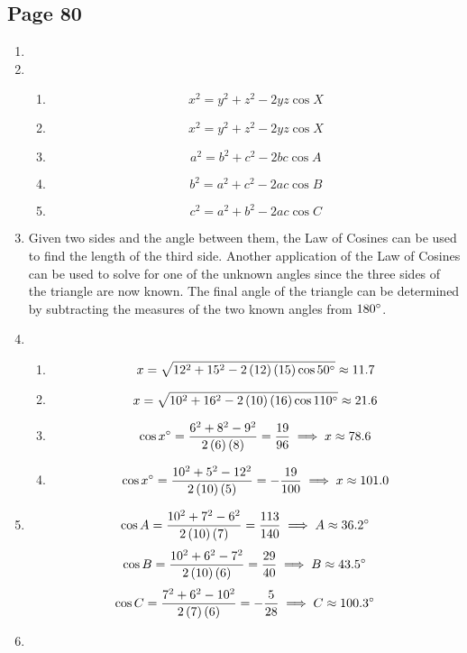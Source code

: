 \documentclass{article}
\newenvironment{solutions}[1]
{\subsection*{#1}
 \begin{enumerate}[leftmargin=1.5em]}
{\end{enumerate}}
\newcommand{\solution}{\item}
\newenvironment{subsolutions}
{\begin{enumerate}}
{\end{enumerate}}
\newcommand{\subsolution}{\item}
\begin{document}
\begin{solutions}{Page 80}
\solution %
\solution %
\begin{subsolutions}
\subsolution %
\[
x^2 = y^2 + z^2 - 2yz\cos{X}
\]
\subsolution %
\[
x^2 = y^2 + z^2 - 2yz\cos{X}
\]
\subsolution %
\[
a^2 = b^2 + c^2 - 2bc\cos{A}
\]
\subsolution %
\[
b^2 = a^2 + c^2 - 2ac\cos{B}
\]
\subsolution %
\[
c^2 = a^2 + b^2 - 2ac\cos{C}
\]
\end{subsolutions}

\solution %
Given two sides and the angle between them, the Law of Cosines can be used to find the length of the third side. Another application of the Law of Cosines can be used to solve for one of the unknown angles since the three sides of the triangle are now known. The final angle of the triangle can be determined by subtracting the measures of the two known angles from $180\degree$.

\solution %
\begin{subsolutions}
\subsolution %
\[
x = \sqrt{12^2+15^2-2\left(12\right)\left(15\right)\cos{50\degree}} \approx 11.7
\]
\subsolution %
\[
x = \sqrt{10^2+16^2-2\left(10\right)\left(16\right)\cos{110\degree}} \approx 21.6
\]
\subsolution %
\[
\cos{x\degree} = \dfrac{6^2+8^2-9^2}{2\left(6\right)\left(8\right)} = \dfrac{19}{96} \implies x \approx 78.6
\]
\subsolution %
\[
\cos{x\degree} = \dfrac{10^2+5^2-12^2}{2\left(10\right)\left(5\right)} = -\dfrac{19}{100} \implies x \approx101.0
\]
\end{subsolutions}

\solution %
\[
\cos{A} = \dfrac{10^2+7^2-6^2}{2\left(10\right)\left(7\right)} = \dfrac{113}{140} \implies A \approx 36.2\degree
\]
\[
\cos{B} = \dfrac{10^2+6^2-7^2}{2\left(10\right)\left(6\right)} = \dfrac{29}{40} \implies B \approx 43.5\degree
\]
\[
\cos{C} = \dfrac{7^2+6^2-10^2}{2\left(7\right)\left(6\right)} = -\dfrac{5}{28} \implies C \approx 100.3\degree
\]
\solution ~ %
\begin{center}
\end{center}


\end{solutions}
\end{document}
